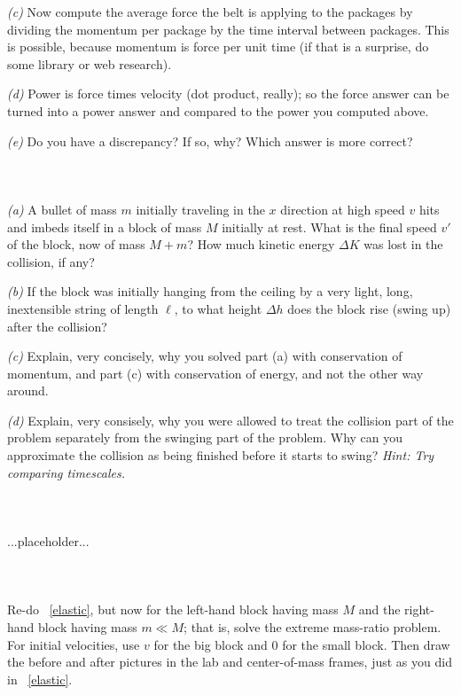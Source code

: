 \documentclass[12pt]{article}
\newcounter{problem}
\begin{document}
\textsl{(c)} Now compute the average force the belt is applying to the
packages by dividing the momentum per package by the time interval
between packages. This is possible, because momentum is force per unit
time (if that is a surprise, do some library or web research).

\textsl{(d)} Power is force times velocity (dot product, really); so
the force answer can be turned into a power answer and compared to the
power you computed above.

\textsl{(e)} Do you have a discrepancy? If so, why? Which answer is
more correct?

\paragraph{\problemname~\theproblem}

\textsl{(a)} A bullet of mass $m$ initially traveling in the $x$
direction at high speed $v$ hits and imbeds itself in a block of mass
$M$ initially at rest.  What is the final speed $v'$ of the block,
now of mass $M+m$?  How much kinetic energy $\Delta K$ was lost in the
collision, if any?

\textsl{(b)} If the block was initially hanging from the ceiling by a
very light, long, inextensible string of length $\ell$, to what height
$\Delta h$ does the block rise (swing up) after the collision?

\textsl{(c)} Explain, very concisely, why you solved part (a) with
conservation of momentum, and part (c) with conservation of energy,
and not the other way around.

\textsl{(d)} Explain, very consisely, why you were allowed to treat
the collision part of the problem separately from the swinging part of
the problem.  Why can you approximate the collision as being finished
before it starts to swing?  \textit{Hint: Try comparing timescales.}

\paragraph{\problemname~\theproblem}\label{elastic}
...placeholder...

\paragraph{\problemname~\theproblem}

Re-do \problemname~\ref{elastic}, but now for the left-hand block having
mass $M$ and the right-hand block having mass $m\ll M$; that is, solve
the extreme mass-ratio problem. For initial velocities, use $v$ for
the big block and $0$ for the small block. Then draw the before and
after pictures in the lab and center-of-mass frames, just as you did
in \problemname~\ref{elastic}.
\end{document}
